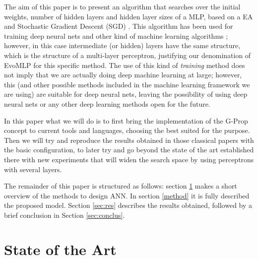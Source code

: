 \documentclass[runningheads]{llncs}
\begin{document}
The aim of this paper is to present an algorithm that searches over the initial weights, number of
hidden layers and hidden layer sizes of a MLP, based on a EA and
Stochastic Gradient Descent (SGD) \cite{bottou2012stochastic}. This
algorithm has been used for training deep neural nets and other kind
of machine learning algorithms
\cite{bottou2012stochastic,bottou2010large}; however, in this case
intermediate (or hidden) layers have the same structure,
which is the structure of a multi-layer perceptron, justifying our
denomination of {\sf EvoMLP} for this specific method.
The use of this kind of {\em training} method does not imply that we
are actually doing deep machine learning at large; however, this (and
other possible methods included in the machine learning framework we
are using) are suitable for deep neural nets,
leaving the possibility of using deep neural nets or any other
deep learning methods open for the future.

In this paper what we will do is to first bring the implementation of
the G-Prop concept to current tools and languages, choosing the best
suited for the purpose. Then we will try and reproduce the results
obtained in those classical papers with the basic configuration, to
later try and go beyond the state of the art established there with
new experiments that will widen the search space by using perceptrons
with several layers.

The remainder of this paper is structured as follows:
section \ref{soa} makes a short overview of the methods to design ANN.
In section \ref{method} it is fully described the proposed model.
Section \ref{sec:res} describes the results obtained,
followed by a brief conclusion in Section \ref{sec:conclus}.

\section{State of the Art}
\label{soa}
\end{document}

